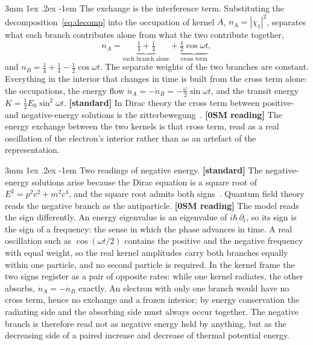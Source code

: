 \documentclass[%
 reprint, amsmath,amssymb, aps, prb, ]{revtex4-2}
\makeatletter
\numberwithin{equation}{section}
\renewcommand\paragraph{%
  \@startsection{paragraph}{4}{\z@}%
    {3mm \@plus 1ex \@minus .2ex}%
    {-1em}%
    {\normalfont\normalsize\itshape}}
\makeatother
\begin{document}
\paragraph{The exchange is the interference term.} Substituting the decomposition~\eqref{eq:decomp} into the occupation of kernel $A$, $n_A=|\chi_1|^2$, separates what each branch contributes alone from what the two contribute together,
\begin{equation}
n_A=\underbrace{\tfrac14+\tfrac14}_{\text{each branch alone}}+\underbrace{\tfrac12\cos\omega t}_{\text{cross term}},
\label{eq:interf}
\end{equation}
and $n_B=\tfrac14+\tfrac14-\tfrac12\cos\omega t$. The separate weights of the two branches are constant. Everything in the interior that changes in time is built from the cross term alone: the occupations, the energy flow $\dot n_A=-\dot n_B=-\tfrac{\omega}{2}\sin\omega t$, and the transit energy $K=\tfrac12E_0\sin^2\omega t$. \textbf{[standard]} In Dirac theory the cross term between positive- and negative-energy solutions is the zitterbewegung~\cite{ref:schrodinger,ref:thaller}. \textbf{[0SM reading]} The energy exchange between the two kernels is that cross term, read as a real oscillation of the electron's interior rather than as an artefact of the representation.

\paragraph{Two readings of negative energy.} \textbf{[standard]} The negative-energy solutions arise because the Dirac equation is a square root of $E^2=p^2c^2+m^2c^4$, and the square root admits both signs~\cite{ref:dirac28}. Quantum field theory reads the negative branch as the antiparticle. \textbf{[0SM reading]} The model reads the sign differently. An energy eigenvalue is an eigenvalue of $i\hbar\,\partial_t$, so its sign is the sign of a frequency: the sense in which the phase advances in time. A real oscillation such as $\cos(\omega t/2)$ contains the positive and the negative frequency with equal weight, so the real kernel amplitudes carry both branches equally within one particle, and no second particle is required. In the kernel frame the two signs register as a pair of opposite rates: while one kernel radiates, the other absorbs, $\dot n_A=-\dot n_B$ exactly. An electron with only one branch would have no cross term, hence no exchange and a frozen interior; by energy conservation the radiating side and the absorbing side must always occur together. The negative branch is therefore read not as negative energy held by anything, but as the decreasing side of a paired increase and decrease of thermal potential energy.
\end{document}
